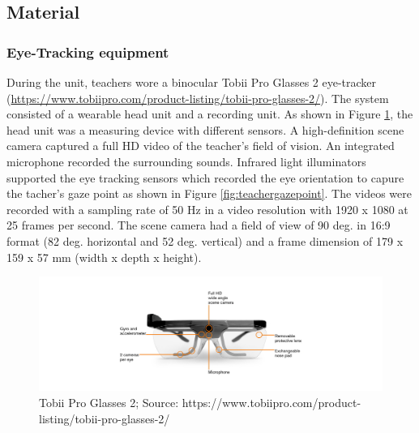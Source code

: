 \documentclass[
  man,floatsintext]{apa6}
\begin{document}
\hypertarget{material}{%
\subsection{Material}\label{material}}

\hypertarget{eye-tracking-equipment}{%
\subsubsection{Eye-Tracking equipment}\label{eye-tracking-equipment}}

During the unit, teachers wore a binocular Tobii Pro Glasses 2 eye-tracker (\url{https://www.tobiipro.com/product-listing/tobii-pro-glasses-2/}). The system consisted of a wearable head unit and a recording unit. As shown in Figure \ref{fig:tobiiglasses2}, the head unit was a measuring device with different sensors. A high-definition scene camera captured a full HD video of the teacher's field of vision. An integrated microphone recorded the surrounding sounds. Infrared light illuminators supported the eye tracking sensors which recorded the eye orientation to capure the tacher's gaze point as shown in Figure \ref{fig:teachergazepoint}. The videos were recorded with a sampling rate of 50 Hz in a video resolution with 1920 x 1080 at 25 frames per second. The scene camera had a field of view of 90 deg. in 16:9 format (82 deg. horizontal and 52 deg. vertical) and a frame dimension of 179 x 159 x 57 mm (width x depth x height).

\begin{figure}

{\centering \includegraphics{./pictures/tobiiglasses2} 

}

\caption{Tobii Pro Glasses 2; Source: https://www.tobiipro.com/product-listing/tobii-pro-glasses-2/}\label{fig:tobiiglasses2}
\end{figure}
\end{document}
